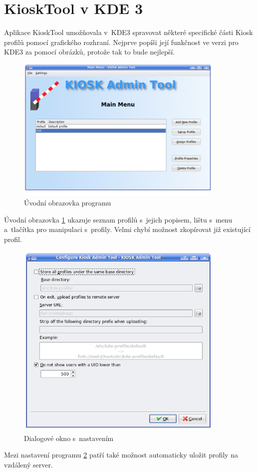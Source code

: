 \section{KioskTool v KDE 3}
Aplikace KioskTool umožňovala v~KDE3 spravovat některé specifické části Kiosk profilů pomocí grafického rozhraní. Nejprve popíši její funkčnost ve verzi pro KDE3 za pomocí obrázků, protože tak to bude nejlepší.

\begin{figure}[h]
    \centering
    \includegraphics[width=10cm]{obrazky/KioskToolKDE3/uvodni_obrazovka.png}
    \caption{Úvodní obrazovka programu}
    \label{fig:kt3_uvodni}
\end{figure}
Úvodní obrazovka \ref{fig:kt3_uvodni} ukazuje seznam profilů s~jejich popisem, lištu s~menu a~tlačítka pro manipulaci s~profily. Velmi chybí možnost zkopírovat již existující profil.

\begin{figure}[h]
    \centering
    \includegraphics[width=10cm]{obrazky/KioskToolKDE3/nastaveni.png}
    \caption{Dialogové okno s~nastavením}
    \label{fig:kt3_nastaveni}
\end{figure}
Mezi nastavení programu \ref{fig:kt3_nastaveni} patří také možnost automaticky uložit profily na vzdálený server.

